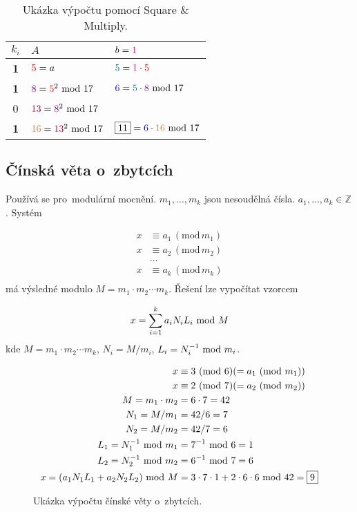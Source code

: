 \begin{table}[ht]
\centering
\begin{tabular}{c|ll}
$k_i$      & $A$                                                & $b = {\color{magenta}1}$ \\
\hline
\textbf{1} & ${\color{red}5} = a$                               & ${\color{teal}5} = {\color{magenta}1} \cdot {\color{red}5}$ \\
\textbf{1} & ${\color{violet}8} = {\color{red}5}^2 \ \mathrm{mod}\ 17$     & ${\color{blue}6} = {\color{teal}5} \cdot {\color{violet}8} \ \mathrm{mod}\ 17$ \\
        0  & ${\color{purple}13} = {\color{violet}8}^2 \ \mathrm{mod}\ 17$ & \\
\textbf{1} & ${\color{brown}16} = {\color{purple}13}^2 \ \mathrm{mod}\ 17$ & $\boxed{11} = {\color{blue}6} \cdot {\color{brown}16} \ \mathrm{mod}\ 17$ \\
\end{tabular}
\caption*{Ukázka výpočtu pomocí Square \& Multiply.}
\end{table} 

\clearpage
\subsection{Čínská věta o~zbytcích}

Používá se pro~modulární mocnění. $m_1, \dots, m_k$ jsou nesoudělná čísla. $a_1, \dots, a_k \in \mathbb{Z}$. Systém

\begin{align*}
x &\equiv a_1 \,(\mathrm{mod}\, m_1) \\
x &\equiv a_2 \,(\mathrm{mod}\, m_2) \\
&\dots \\
x &\equiv a_k \,(\mathrm{mod}\, m_k) \\
\end{align*} %
má výsledné modulo $M = m_1 \cdot m_2 \cdots m_k$. Řešení lze vypočítat vzorcem

$$ x = \sum_{i=1}^{k} a_i N_i L_i \ \mathrm{mod}\ M $$
kde $M = m_1 \cdot m_2 \cdots m_k$, $N_i = M / m_i$, $L_i = N_i^{-1} \ \mathrm{mod}\ m_i$.

\begin{figure}[ht]
\centering
\begin{align*}
x &\equiv 3 \ (\mathrm{mod}\ 6) (= a_1 \ (\mathrm{mod}\ m_1)) \\
x &\equiv 2 \ (\mathrm{mod}\ 7) (= a_2 \ (\mathrm{mod}\ m_2)) \\
M = m_1 \cdot m_2 &= 6 \cdot 7 = 42 \\
N_1 = M / m_1 &= 42 / 6 = 7 \\
N_2 = M / m_2 &= 42 / 7 = 6 \\
L_1 = N_1^{-1} \ \mathrm{mod}\ m_1 &= 7^{-1} \ \mathrm{mod}\ 6 = 1 \\
L_2 = N_2^{-1} \ \mathrm{mod}\ m_2 &= 6^{-1} \ \mathrm{mod}\ 7 = 6 \\
x = (a_1 N_1 L_1 + a_2 N_2 L_2) \ \mathrm{mod}\ M &= 3 \cdot 7 \cdot 1 + 2 \cdot 6 \cdot 6 \ \mathrm{mod}\ 42 = \boxed{9} \\
\end{align*}
\vspace*{-4em}
\caption*{Ukázka výpočtu čínské věty o~zbytcích.}
\end{figure}

